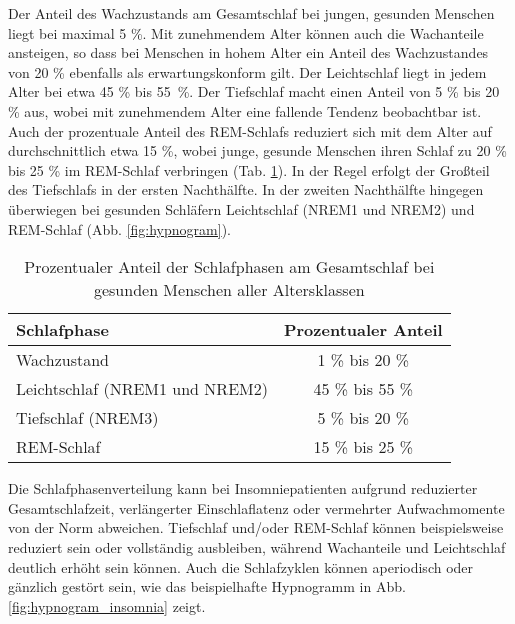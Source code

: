Der Anteil des Wachzustands am Gesamtschlaf bei jungen, gesunden Menschen liegt bei maximal 5 \%. Mit zunehmendem Alter können auch die Wachanteile ansteigen, so dass bei Menschen in hohem Alter ein Anteil des Wachzustandes von 20 \% ebenfalls als erwartungskonform gilt. Der Leichtschlaf liegt in jedem Alter bei etwa 45 \% bis 55~\%. Der Tiefschlaf macht einen Anteil von 5 \% bis 20 \% aus, wobei mit zunehmendem Alter eine fallende Tendenz beobachtbar ist. Auch der prozentuale Anteil des \acs{REM}-Schlafs reduziert sich mit dem Alter auf durchschnittlich etwa 15 \%, wobei junge, gesunde Menschen ihren Schlaf zu 20 \% bis 25 \% im \acs{REM}-Schlaf verbringen (Tab. \ref{tab:anteile_schlafphasen}). In der Regel erfolgt der Großteil des Tiefschlafs in der ersten Nachthälfte. In der zweiten Nachthälfte hingegen überwiegen bei gesunden Schläfern Leichtschlaf (\acs{NREM}1 und \acs{NREM}2) und \acs{REM}-Schlaf (Abb. \ref{fig:hypnogram}). \parencite{lee-chiong_sleep_2008, steinberg_schlafmedizin_2010, danker-hopfe_percentile_2005}

\begin{table}[H]
\begin{small}
\centering
\begin{tabular}{|l|c|}
\hline
\textbf{Schlafphase} & \textbf{Prozentualer Anteil} \\
\hline
Wachzustand & 1 \% bis 20 \% \\
\hline
Leichtschlaf (\acs{NREM}1 und \acs{NREM}2) & 45 \% bis 55 \%\\
\hline
Tiefschlaf (\acs{NREM}3) & 5 \% bis 20 \%\\
\hline
\acs{REM}-Schlaf & 15 \% bis 25 \%\\
\hline
\end{tabular}
\caption[Prozentuale Schlafphasenverteilung]{Prozentualer Anteil der Schlafphasen am Gesamtschlaf bei gesunden Menschen aller Altersklassen \parencite{lee-chiong_sleep_2008, steinberg_schlafmedizin_2010, danker-hopfe_percentile_2005}}
\label{tab:anteile_schlafphasen}
\end{small}
\end{table}

Die Schlafphasenverteilung kann bei Insomniepatienten aufgrund reduzierter Gesamtschlafzeit, verlängerter Einschlaflatenz oder vermehrter Aufwachmomente von der Norm abweichen. Tiefschlaf und/oder \acs{REM}-Schlaf können beispielsweise reduziert sein oder vollständig ausbleiben, während Wachanteile und Leichtschlaf deutlich erhöht sein können. Auch die Schlafzyklen können aperiodisch oder gänzlich gestört sein, wie das beispielhafte Hypnogramm in Abb. \ref{fig:hypnogram_insomnia} zeigt. \parencite{happe_schlafmedizin_2009}

